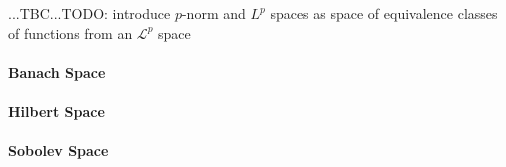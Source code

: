  ...TBC...TODO: introduce $p$-norm and $L^p$ spaces as space of equivalence classes of functions from an $\mathcal{L}^p$ space



\paragraph{Banach Space}

\paragraph{Hilbert Space}


\paragraph{Sobolev Space}







